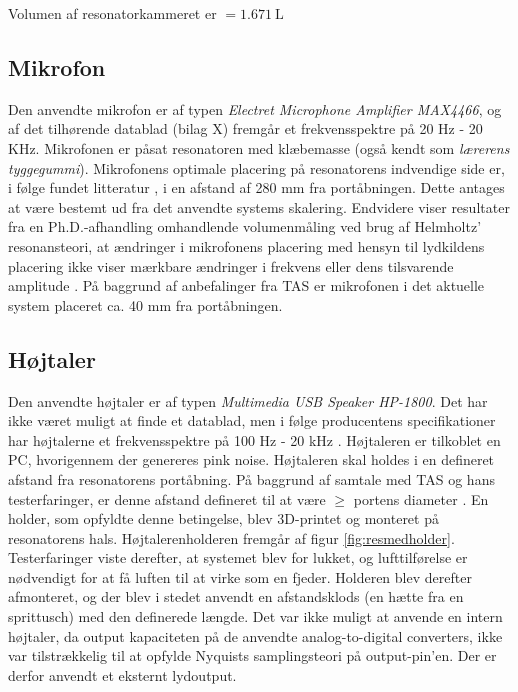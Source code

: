 Volumen af resonatorkammeret er $={\SI{1.671}{\liter}}$
 
\subsection{Mikrofon}
Den anvendte mikrofon er af typen \textit{Electret Microphone Amplifier MAX4466}, og af det tilhørende datablad (bilag X) fremgår et frekvensspektre på 20 Hz - 20 KHz. Mikrofonen er påsat resonatoren med klæbemasse (også kendt som \textit{lærerens tyggegummi}).  
Mikrofonens optimale placering på resonatorens indvendige side er, i følge fundet litteratur \citep{RefWorks:11}, i en afstand af 280 mm fra portåbningen. Dette antages at være bestemt ud fra det anvendte systems skalering. Endvidere viser resultater fra en Ph.D.-afhandling omhandlende volumenmåling ved brug af Helmholtz' resonansteori, at ændringer i mikrofonens placering med hensyn til lydkildens placering ikke viser mærkbare ændringer i frekvens eller dens tilsvarende amplitude \citep{RefWorks:22}. På baggrund af anbefalinger fra TAS er mikrofonen i det aktuelle system placeret ca. 40 mm fra portåbningen.  

\subsection{Højtaler}
Den anvendte højtaler er af typen \textit{Multimedia USB Speaker HP-1800}. Det har ikke været muligt at finde et datablad, men i følge producentens specifikationer har højtalerne et frekvensspektre på 100 Hz - 20 kHz \citep{RefWorks:30}. Højtaleren er tilkoblet en PC, hvorigennem der genereres pink noise. Højtaleren skal holdes i en defineret afstand fra resonatorens portåbning.  På baggrund af samtale med TAS og hans testerfaringer, er denne afstand defineret til at være $\geq$ portens diameter \citep{RefWorks:31}. En holder, som opfyldte denne betingelse, blev 3D-printet og monteret på resonatorens hals. Højtalerenholderen fremgår af figur \ref{fig:resmedholder}. Testerfaringer viste derefter, at systemet blev for lukket, og lufttilførelse er nødvendigt for at få luften til at virke som en fjeder. Holderen blev derefter afmonteret, og der blev i stedet anvendt en afstandsklods (en hætte fra en sprittusch) med den definerede længde. Det var ikke muligt at anvende en intern højtaler, da output kapaciteten på de anvendte analog-to-digital converters, ikke var tilstrækkelig til at opfylde Nyquists samplingsteori på output-pin'en. Der er derfor anvendt et eksternt lydoutput. 

